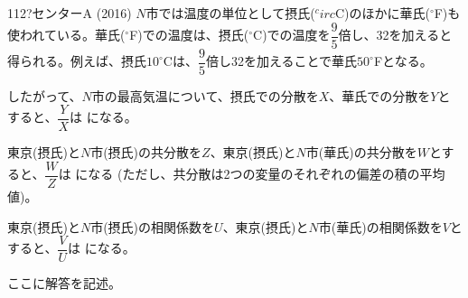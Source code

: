 \begin{thm}{112}{\hosi ?}{センターA (2016)}
 $N$市では温度の単位として摂氏(${^circ}$C)のほかに華氏(${}^\circ$F)も使われている。華氏(${}^\circ$F)での温度は、摂氏(${}^\circ$C)での温度を$\dfrac{9}{5}$倍し、32を加えると得られる。例えば、摂氏$10^\circ$Cは、$\dfrac{9}{5}$倍し32を加えることで華氏$50^\circ$Fとなる。

したがって、$N$市の最高気温について、摂氏での分散を$X$、華氏での分散を$Y$とすると、$\dfrac{Y}{X}$は  になる。

東京(摂氏)と$N$市(摂氏)の共分散を$Z$、東京(摂氏)と$N$市(華氏)の共分散を$W$とすると、$\dfrac{W}{Z}$は  になる (ただし、共分散は2つの変量のそれぞれの偏差の積の平均値)。

東京(摂氏)と$N$市(摂氏)の相関係数を$U$、東京(摂氏)と$N$市(華氏)の相関係数を$V$とすると、$\dfrac{V}{U}$は  になる。
\end{thm}

ここに解答を記述。